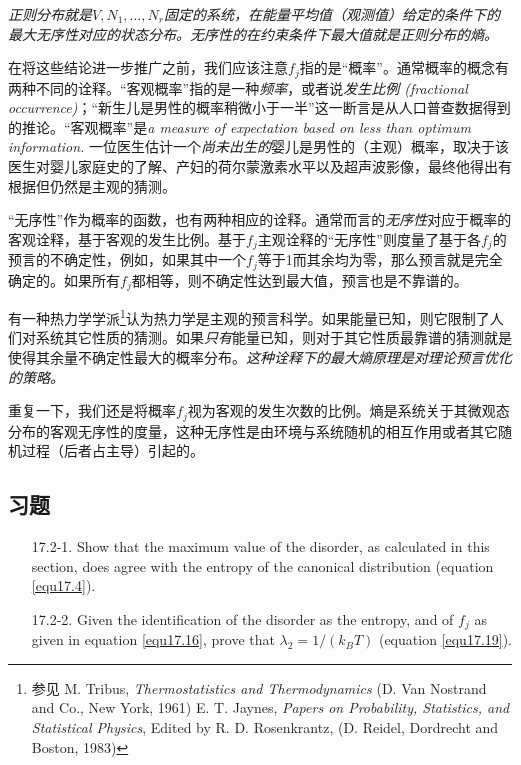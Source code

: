 \textit{正则分布就是$V, N_1, \dots, N_r$固定的系统，在能量平均值（观测值）给定的条件下的最大无序性对应的状态分布。无序性的在约束条件下最大值就是正则分布的熵。}

在将这些结论进一步推广之前，我们应该注意$f_j$指的是“概率”。通常概率的概念有两种不同的诠释。“客观概率”指的是一种\textit{频率}，或者说\textit{发生比例 (fractional occurrence)}；“新生儿是男性的概率稍微小于一半”这一断言是从人口普查数据得到的推论。“客观概率”是\textit{a measure of expectation based on less than optimum information.} 一位医生估计一个\textit{尚未出生的}婴儿是男性的（主观）概率，取决于该医生对婴儿家庭史的了解、产妇的荷尔蒙激素水平以及超声波影像，最终他得出有根据但仍然是主观的猜测。

“无序性”作为概率的函数，也有两种相应的诠释。通常而言的\textit{无序性}对应于概率的客观诠释，基于客观的发生比例。基于$f_j$主观诠释的“无序性”则度量了基于各$f_j$的预言的不确定性，例如，如果其中一个$f_j$等于1而其余均为零，那么预言就是完全确定的。如果所有$f_j$都相等，则不确定性达到最大值，预言也是不靠谱的。

有一种热力学学派\footnote{参见 M. Tribus, \textit{Thermostatistics and Thermodynamics} (D. Van Nostrand and Co., New York, 1961) E. T. Jaynes, \textit{Papers on Probability, Statistics, and Statistical Physics}, Edited by R. D. Rosenkrantz, (D. Reidel, Dordrecht and Boston, 1983)}认为热力学是主观的预言科学。如果能量已知，则它限制了人们对系统其它性质的猜测。如果\textit{只有}能量已知，则对于其它性质最靠谱的猜测就是使得其余量不确定性最大的概率分布。\textit{这种诠释下的最大熵原理是对理论预言优化的策略。}

重复一下，我们还是将概率$f_j$视为客观的发生次数的比例。熵是系统关于其微观态分布的客观无序性的度量，这种无序性是由环境与系统随机的相互作用或者其它随机过程（后者占主导）引起的。

\subsection*{习题}
\begin{itemize}
	\item[17.2-1.] Show that the maximum value of the disorder, as calculated in this section, does agree with the entropy of the canonical distribution (equation \eqref{equ17.4}).
	\item[17.2-2.] Given the identification of the disorder as the entropy, and of $f_j$ as given in equation \eqref{equ17.16}, prove that $\lambda_2 = 1 / (k_B T)$ (equation \eqref{equ17.19}).
\end{itemize}



